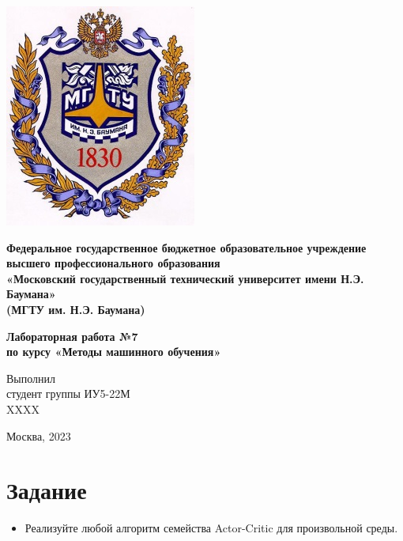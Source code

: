 \documentclass[a4paper]{article}
\begin{document}
  \fontsize{14}{16}\selectfont

  \begin{titlepage}
    \begin{minipage}{0.2\textwidth}
      \includegraphics[scale=0.4]{logo}
    \end{minipage}
    \begin{minipage}{0.7\textwidth}\centering
      \fontsize{10}{12}\selectfont
      \textbf{
        Федеральное государственное бюджетное образовательное учреждение \\
        высшего профессионального образования \\
        «Московский государственный технический университет имени Н.Э. Баумана» \\
        (МГТУ им. Н.Э. Баумана)
      }
    \end{minipage}

    \vspace{5cm}
    \centering
    \fontsize{16}{20}\textbf{
      Лабораторная работа №7 \\
      по курсу «Методы машинного обучения» \\
    }

    \vspace{5cm}
    \begin{flushright}
    Выполнил \\
    студент группы ИУ5-22М \\
    XXXX \\
    \end{flushright}
    \vspace*{\fill}
    Москва, 2023
  \end{titlepage}

  \justifying
  \setlength{\parindent}{1.25cm}

  \section{Задание}
  \begin{itemize}
    \item Реализуйте любой алгоритм семейства Actor-Critic для произвольной среды.
  \end{itemize}
\end{document}
